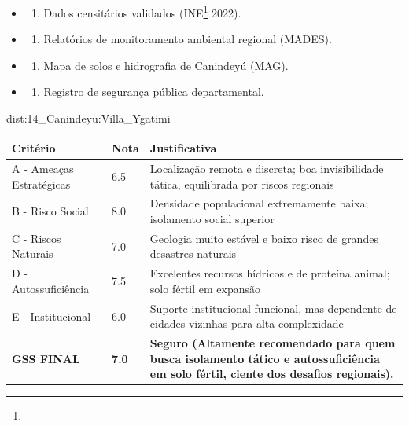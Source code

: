 {\begin{itemize}
\tightlist
\item
  \begin{enumerate}
  \def\labelenumi{\arabic{enumi})}
  \tightlist
  \item
    Dados censitários validados (INE\footnote{\fineINE} 2022).
  \end{enumerate}
\item
  \begin{enumerate}
  \def\labelenumi{\arabic{enumi})}
  \setcounter{enumi}{1}
  \tightlist
  \item
    Relatórios de monitoramento ambiental regional (MADES).
  \end{enumerate}
\item
  \begin{enumerate}
  \def\labelenumi{\arabic{enumi})}
  \setcounter{enumi}{2}
  \tightlist
  \item
    Mapa de solos e hidrografia de Canindeyú (MAG).
  \end{enumerate}
\item
  \begin{enumerate}
  \def\labelenumi{\arabic{enumi})}
  \setcounter{enumi}{3}
  \tightlist
  \item
    Registro de segurança pública departamental.
  \end{enumerate}
\end{itemize}}{dist:14_Canindeyu:Villa_Ygatimi}
\begin{table}[ht!]
\small \begin{tabular}{p{3.0cm}p{0.8cm}p{6.0cm}} \toprule
\textbf{Critério} & \textbf{Nota} & \textbf{Justificativa} \\ \midrule
A - Ameaças Estratégicas & 6.5 & Localização remota e discreta; boa invisibilidade tática, equilibrada por riscos regionais \\
B - Risco Social & 8.0 & Densidade populacional extremamente baixa; isolamento social superior \\
C - Riscos Naturais & 7.0 & Geologia muito estável e baixo risco de grandes desastres naturais \\
D - Autossuficiência & 7.5 & Excelentes recursos hídricos e de proteína animal; solo fértil em expansão \\
E - Institucional & 6.0 & Suporte institucional funcional, mas dependente de cidades vizinhas para alta complexidade \\
\midrule \textbf{GSS FINAL} & \textbf{7.0} & \textbf{Seguro (Altamente recomendado para quem busca isolamento tático e autossuficiência em solo fértil, ciente dos desafios regionais).} \\ \bottomrule \end{tabular}
\end{table}
